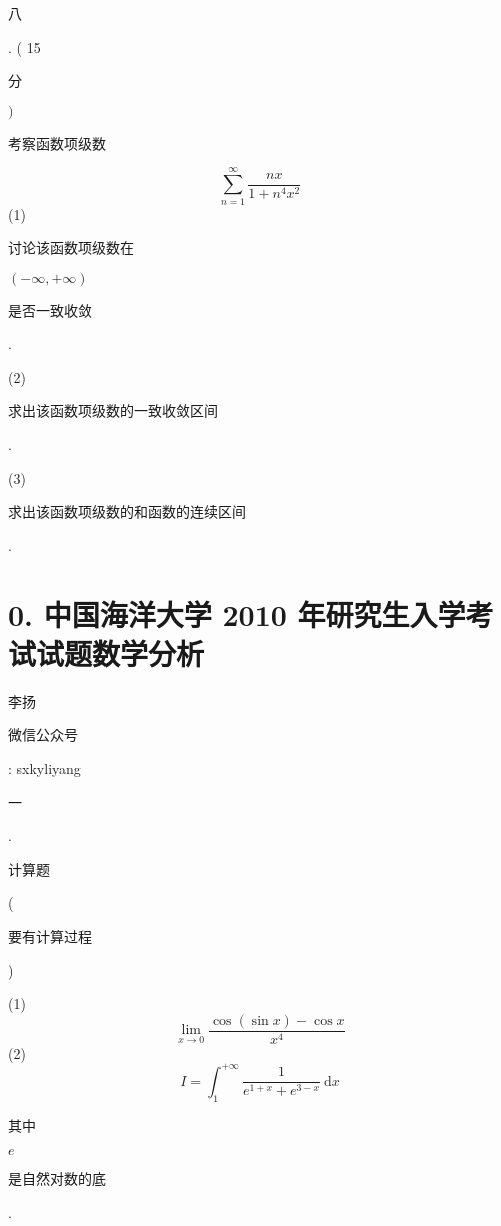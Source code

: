 \documentclass[10pt]{article}
\begin{document}
\begin{CJK}{UTF8}{mj}八\end{CJK}. ( 15 \begin{CJK}{UTF8}{mj}分\end{CJK} $)$ \begin{CJK}{UTF8}{mj}考察函数项级数\end{CJK}
$$
\sum_{n=1}^{\infty} \frac{n x}{1+n^{4} x^{2}}
$$
(1) \begin{CJK}{UTF8}{mj}讨论该函数项级数在\end{CJK} $(-\infty,+\infty)$ \begin{CJK}{UTF8}{mj}是否一致收敛\end{CJK}.

(2) \begin{CJK}{UTF8}{mj}求出该函数项级数的一致收敛区间\end{CJK}.

(3) \begin{CJK}{UTF8}{mj}求出该函数项级数的和函数的连续区间\end{CJK}.

\section{0. 中国海洋大学 2010 年研究生入学考试试题数学分析}
\begin{CJK}{UTF8}{mj}李扬\end{CJK}

\begin{CJK}{UTF8}{mj}微信公众号\end{CJK}: sxkyliyang

\begin{CJK}{UTF8}{mj}一\end{CJK}. \begin{CJK}{UTF8}{mj}计算题\end{CJK} (\begin{CJK}{UTF8}{mj}要有计算过程\end{CJK})

(1)
$$
\lim _{x \rightarrow 0} \frac{\cos (\sin x)-\cos x}{x^{4}}
$$
(2)
$$
I=\int_{1}^{+\infty} \frac{1}{e^{1+x}+e^{3-x}} \mathrm{~d} x
$$
\begin{CJK}{UTF8}{mj}其中\end{CJK} $e$ \begin{CJK}{UTF8}{mj}是自然对数的底\end{CJK}.
\end{document}
